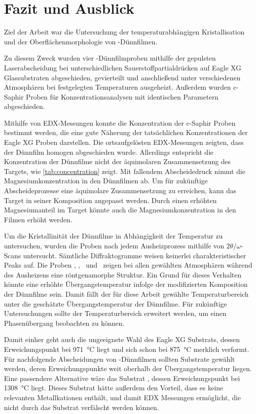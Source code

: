 \section{Fazit und Ausblick}\label{sec:fazit-und-ausblick}
Ziel der Arbeit war die Untersuchung der temperaturabhängigen Kristallisation und der Oberflächenmorphologie von
\heo-Dünnfilmen.

Zu diesem Zweck wurden vier \heo-Dünnfilmproben mithilfe der gepulsten Laserabscheidung bei unterschiedlichen
Sauerstoffpartialdrücken auf Eagle XG Glassubstraten abgeschieden, gevierteilt und anschließend unter verschiedenen
Atmosphären bei festgelegten Temperaturen ausgeheizt.
Außerdem wurden c-Saphir Proben für Konzentrationsanalysen mit identischen Parametern abgeschieden.

Mithilfe von EDX-Messungen konnte die Konzentration der c-Saphir Proben bestimmt werden, die eine gute Näherung
der tatsächlichen Konzentrationen der Eagle XG Proben darstellen.
Die ortsaufgelösten EDX-Messungen zeigten, dass der Dünnfilm homogen abgeschieden wurde.
Allerdings entspricht die Konzentration der Dünnfilme nicht der äquimolaren Zusammensetzung des Targets, wie
\cref{tab:concentration} zeigt.
Mit fallendem Abscheidedruck nimmt die Magnesiumkonzentration in den Dünnfilmen ab.
Um für zukünftige Abscheideprozesse eine äquimolare Zusammensetzung zu erreichen, kann das Target in seiner
Komposition angepasst werden.
Durch einen erhöhten Magnesiumanteil im Target könnte auch die Magnesiumkonzentration in den Filmen erhöht werden.

Um die Kristallinität der Dünnfilme in Abhängigkeit der Temperatur zu untersuchen, wurden die Proben nach jedem
Ausheizprozess mithilfe von $2\theta/\omega$-Scans untersucht.
Sämtliche Diffraktogramme weisen keinerlei charakteristischer Peaks auf.
Die Proben \samplethree, \sampleone, \sampletwo\ und \samplefour\ zeigen bei allen
gewählten Atmosphären während des Ausheizens eine röntgenamorphe Struktur.
Ein Grund für dieses Verhalten könnte eine erhöhte Übergangstemperatur infolge der modifizierten Komposition der
Dünnfilme sein.
Damit fällt der für diese Arbeit gewählte Temperaturbereich unter die geschätzte Übergangstemperatur der Dünnfilme.
Für zukünftige Untersuchungen sollte der Temperaturbereich erweitert werden, um einen Phasenübergang
beobachten zu können.

Damit einher geht auch die ungeeignete Wahl des Eagle XG Substrats, dessen Erweichungspunkt bei
\qty{971}{\degreeCelsius} liegt und sich schon bei \qty{875}{\degreeCelsius} merklich verformt.
Für nachfolgende Abscheidungen von \heo-Dünnfilmen sollten Substrate gewählt werden, deren Erweichungspunkte weit
oberhalb der Übergangstemperatur liegen.
Eine passendere Alternative wäre das Substrat , dessen Erweichungspunkt bei \qty{1308}{\degreeCelsius} liegt.
Dieses Substrat hätte außerdem den Vorteil, dass es keine relevanten Metallkationen enthält, und damit
EDX Messungen ermöglicht, die nicht durch das Substrat verfälscht werden können.

